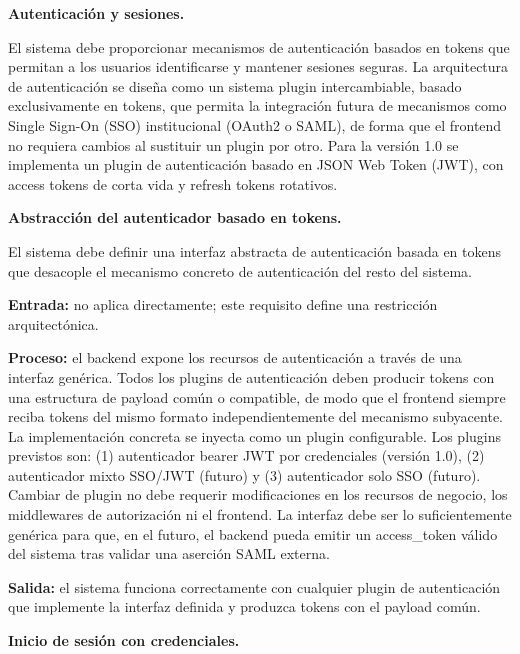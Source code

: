 \begin{functional}

  \item \textbf{Autenticación y sesiones.}

  El sistema debe proporcionar mecanismos de autenticación basados en tokens que permitan a los usuarios identificarse y mantener sesiones seguras. La arquitectura de autenticación se diseña como un sistema plugin intercambiable, basado exclusivamente en tokens, que permita la integración futura de mecanismos como Single Sign-On (SSO) institucional (OAuth2 o SAML), de forma que el frontend no requiera cambios al sustituir un plugin por otro. Para la versión 1.0 se implementa un plugin de autenticación basado en JSON Web Token (JWT), con access tokens de corta vida y refresh tokens rotativos.

  \begin{functional}
    \item \textbf{Abstracción del autenticador basado en tokens.}

    El sistema debe definir una interfaz abstracta de autenticación basada en tokens que desacople el mecanismo concreto de autenticación del resto del sistema.

    \textbf{Entrada:} no aplica directamente; este requisito define una restricción arquitectónica.

    \textbf{Proceso:} el backend expone los recursos de autenticación a través de una interfaz genérica. Todos los plugins de autenticación deben producir tokens con una estructura de payload común o compatible, de modo que el frontend siempre reciba tokens del mismo formato independientemente del mecanismo subyacente. La implementación concreta se inyecta como un plugin configurable. Los plugins previstos son: (1) autenticador bearer JWT por credenciales (versión 1.0), (2) autenticador mixto SSO/JWT (futuro) y (3) autenticador solo SSO (futuro). Cambiar de plugin no debe requerir modificaciones en los recursos de negocio, los middlewares de autorización ni el frontend. La interfaz debe ser lo suficientemente genérica para que, en el futuro, el backend pueda emitir un access\_token válido del sistema tras validar una aserción SAML externa.

    \textbf{Salida:} el sistema funciona correctamente con cualquier plugin de autenticación que implemente la interfaz definida y produzca tokens con el payload común.

    \item \textbf{Inicio de sesión con credenciales.}


\end{functional}
\end{functional}
